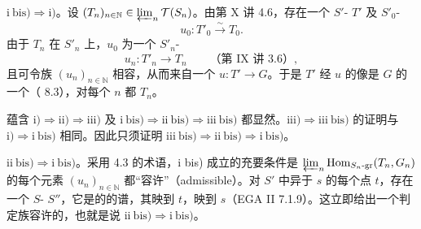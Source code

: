 $\mathrm{i\ bis)}\Rightarrow\mathrm{i)}$。设 $(T_n)_{n\in\mathbb N}\in\varprojlim_n\mathcal T(S_n)$。由第 X 讲 4.6，存在一个 $S'$- $T'$ 及 $S'_0$-
\[u_0:T'_0\xrightarrow{\sim}T_0.\]
由于 $T_n$ 在 $S'_n$ 上，$u_0$ 为一个 $S'_n$-
\[u_n:T'_n\longrightarrow T_n\qquad\text{（第 IX 讲 3.6）},\]
且可令族 $(u_n)_{n\in\mathbb N}$ 相容，从而来自一个 $u:T'\to G$。于是 $T'$ 经 $u$ 的像是 $G$ 的一个（ 8.3），对每个 $n$ 都 $T_n$。

蕴含 $\mathrm{i)}\Rightarrow\mathrm{ii)}\Rightarrow\mathrm{iii)}$ 及 $\mathrm{i\ bis)}\Rightarrow\mathrm{ii\ bis)}\Rightarrow\mathrm{iii\ bis)}$ 都显然。$\mathrm{iii)}\Rightarrow\mathrm{iii\ bis)}$ 的证明与 $\mathrm{i)}\Rightarrow\mathrm{i\ bis)}$ 相同。因此只须证明 $\mathrm{iii\ bis)}\Rightarrow\mathrm{ii\ bis)}\Rightarrow\mathrm{i\ bis)}$。

$\mathrm{ii\ bis)}\Rightarrow\mathrm{i\ bis)}$。采用 4.3 的术语，i bis) 成立的充要条件是 $\varprojlim_n\operatorname{Hom}_{S_n\text{-}\mathrm{gr}}(T_n,G_n)$ 的每个元素 $(u_n)_{n\in\mathbb N}$ 都“容许”（admissible）。对 $S'$ 中异于 $s$ 的每个点 $t$，存在一个 $S$- $S''$，它是的的谱，其映到 $t$，映到 $s$（EGA II 7.1.9）。这立即给出一个判定族容许的，也就是说 $\mathrm{ii\ bis)}\Rightarrow\mathrm{i\ bis)}$。

